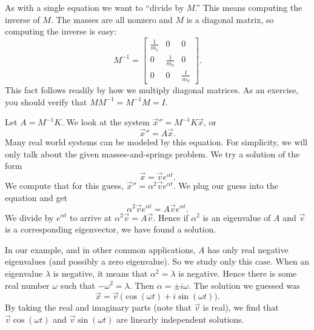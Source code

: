 \documentclass{ximera}
\begin{document}
As with a single equation we want to ``divide by $M$.''  This means computing the inverse of $M$. The masses are all nonzero and $M$ is a diagonal matrix, so computing the inverse is easy:
\begin{equation*}
    M^{-1} =
    \begin{bmatrix}
        \frac{1}{m_1} & 0 & 0 \\
        0 & \frac{1}{m_2} & 0 \\
        0 & 0 & \frac{1}{m_3}
    \end{bmatrix} .
\end{equation*}
This fact follows readily by how we multiply diagonal matrices.  As an exercise, you should verify that $M M^{-1} = M^{-1} M = I$.

Let $A = M^{-1}K$.  We look at the system ${\vec{x}}'' = M^{-1}K \vec{x}$, or
\begin{equation*}
    {\vec{x}}'' = A \vec{x} .
\end{equation*}
Many real world systems can be modeled by this equation.  For simplicity, we will only talk about the given masses-and-springs problem.  We try a solution of the form
\begin{equation*}
    \vec{x} = \vec{v} e^{\alpha t} .
\end{equation*}
We compute that for this guess, ${\vec{x}}'' = \alpha^2 \vec{v} e^{\alpha t}$. We plug our guess into the equation and get
\begin{equation*}
    \alpha^2 \vec{v} e^{\alpha t} = A\vec{v} e^{\alpha t} .
\end{equation*}
We divide by $e^{\alpha t}$ to arrive at $\alpha^2 \vec{v} = A\vec{v}$.  Hence if $\alpha^2$ is an eigenvalue of $A$ and $\vec{v}$ is a corresponding eigenvector, we have found a solution.

In our example, and in other common applications, $A$ has only real negative eigenvalues (and possibly a zero eigenvalue).  So we study only this case.  When an eigenvalue $\lambda$ is negative, it means that $\alpha^2 = \lambda$ is negative.  Hence there is some real number $\omega$ such that $-\omega^2 = \lambda$.  Then $\alpha = \pm i \omega$. The solution we guessed was
\begin{equation*}
    \vec{x} = \vec{v} \, \bigl(\cos (\omega t) + i \sin (\omega t) \bigr) .
\end{equation*}
By taking the real and imaginary parts (note that $\vec{v}$ is real), we find that $\vec{v} \cos (\omega t)$ and $\vec{v} \sin (\omega t)$ are linearly independent solutions.
\end{document}
